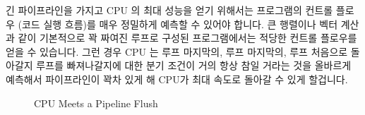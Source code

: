 긴 파이프라인을 가지고 CPU 의 최대 성능을 얻기 위해서는 프로그램의 컨트롤
플로우 (코드 실행 흐름)를 매우 정밀하게 예측할 수 있어야 합니다.
큰 행렬이나 벡터 계산과 같이 기본적으로 꽉 짜여진 루프로 구성된 프로그램에서는
적당한 컨트롤 플로우를 얻을 수 있습니다.
그런 경우 CPU 는 루프 마지막의, 루프 마지막의, 루프 처음으로 돌아갈지 루프를
빠져나갈지에 대한 분기  조건이 거의 항상 참일 거라는 것을 올바르게 예측해서
파이프라인이 꽉차 있게 해 CPU가 최대 속도로 돌아갈 수 있게 할겁니다.

\begin{figure}[tb]
\begin{center}
\end{center}
\caption{CPU Meets a Pipeline Flush}
\end{figure}

